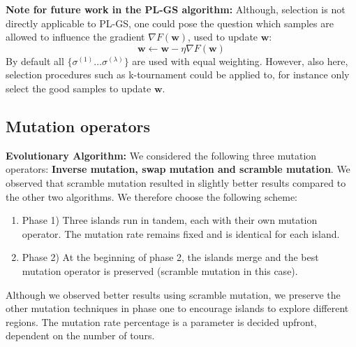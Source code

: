 \documentclass[a4paper,10pt]{article}
\newcommand{\ReplaceMe}[1]{{\color{blue}#1}}
\begin{document}
		
	\textbf{Note for future work in the PL-GS algorithm:}
	Although, selection is not directly applicable to PL-GS, one could pose the question which samples are allowed to influence the gradient $\nabla F\left(\mathbf{w}\right)$, used to update $\mathbf{w}$:
	$$\mathbf{w} \leftarrow \mathbf{w} - \eta \nabla F\left(\mathbf{w}\right)$$
	By default all $\{ \sigma^{(1)} \dots \sigma^{(\lambda)} \} $ are used with equal weighting. However, also here, selection procedures such as k-tournament could be applied to, for instance only select the good samples to update $\mathbf{w}$.
	
	
	

\subsection{Mutation operators}
	\textbf{Evolutionary Algorithm:}
	We considered the following three mutation operators: \textbf{Inverse mutation, swap mutation and scramble mutation}. We observed that scramble mutation resulted in slightly better results compared to the other two algorithms. We therefore choose the following scheme: 
	\begin{enumerate}
		\item Phase 1) Three islands run in tandem, each with their own mutation operator. The mutation rate remains fixed and is identical for each island.
		\item Phase 2) At the beginning of phase 2, the islands merge and the best mutation operator is preserved (scramble mutation in this case).
	\end{enumerate}
	Although we observed better results using scramble mutation, we preserve the other mutation techniques in phase one to encourage islands to explore different regions. The mutation rate percentage is a parameter is decided upfront, dependent on the number of tours.
	

\end{document}
